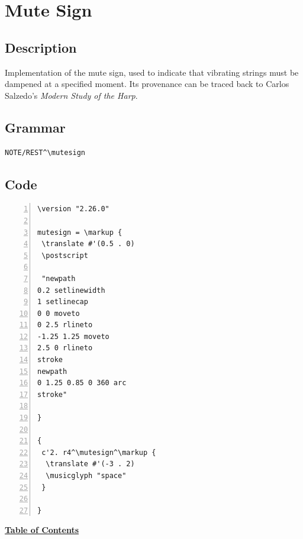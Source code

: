 \vfill \break







\section {Mute Sign}
\hfill

\subsection{Description}
Implementation of the mute sign, used to indicate that vibrating strings must be dampened at a specified moment. Its provenance can be traced back to Carlos Salzedo's \textit{Modern Study of the Harp}.\autocite[19]{RN4} 

\subsection{Grammar}
\begin{verbatim}
NOTE/REST^\mutesign
\end{verbatim}
\subsection{Code}
\begin{Verbatim}[numbers=left,xleftmargin=5mm]
\version "2.26.0"

mutesign = \markup {
 \translate #'(0.5 . 0)
 \postscript

 "newpath
0.2 setlinewidth
1 setlinecap
0 0 moveto
0 2.5 rlineto
-1.25 1.25 moveto
2.5 0 rlineto
stroke
newpath
0 1.25 0.85 0 360 arc
stroke"

}

{
 c'2. r4^\mutesign^\markup {
  \translate #'(-3 . 2)
  \musicglyph "space"
 }

}
\end{Verbatim}
\hyperref[sec:toc]{\textbf{Table of Contents}}

\vfill \break


